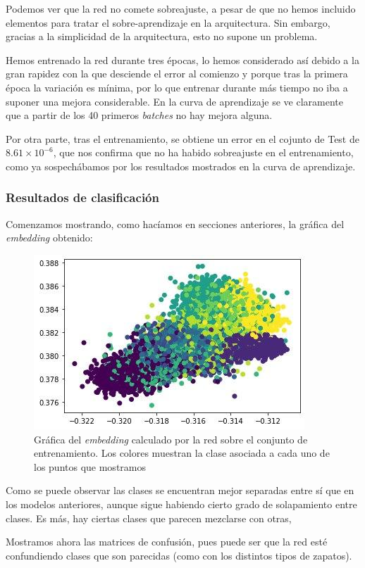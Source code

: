 \documentclass[11pt]{article}
\begin{document}
Podemos ver que la red no comete sobreajuste, a pesar de que no hemos incluido elementos para tratar el sobre-aprendizaje en la arquitectura. Sin embargo, gracias a la simplicidad de la arquitectura, esto no supone un problema. 

Hemos entrenado la red durante tres épocas, lo hemos considerado así debido a la gran rapidez con la que desciende el error  al comienzo y porque tras la primera época la variación es mínima, por lo que entrenar durante más tiempo no iba a suponer una mejora considerable. En la curva de aprendizaje se ve claramente que a partir de los 40 primeros \emph{batches} no hay mejora alguna.

Por otra parte, tras el entrenamiento, se obtiene un error en el cojunto de Test de $8.61 \times 10^{-6}$, que nos confirma que no ha habido sobreajuste en el entrenamiento, como ya sospechábamos por los resultados mostrados en la curva de aprendizaje. 

\subsubsection{Resultados de clasificación}

Comenzamos mostrando, como hacíamos en secciones anteriores, la gráfica del \emph{embedding} obtenido:

\begin{figure}[H]
    \centering
    \includegraphics[width = 0.5 \textwidth]{triples_light_embedding}
    \caption{Gráfica del \emph{embedding} calculado por la red sobre el conjunto de entrenamiento. Los colores muestran la clase asociada a cada uno de los puntos que mostramos}
\end{figure}

Como se puede observar las clases se encuentran mejor separadas entre sí que en los modelos anteriores, aunque sigue habiendo cierto grado de solapamiento entre clases. Es más, hay ciertas clases que parecen mezclarse con otras, 

Mostramos ahora las matrices de confusión, pues puede ser que la red esté confundiendo clases que son parecidas (como con los distintos tipos de zapatos).
\end{document}
